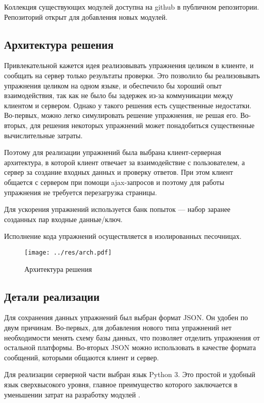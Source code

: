 \documentclass{matmex-diploma-custom}
\begin{document}
Коллекция существующих модулей доступна на github в публичном
репозитории\cite{plugins:repo}. Репозиторий открыт для добавления
новых модулей.

\subsection{Архитектура решения}
Привлекательной кажется идея реализовывать упражнения целиком в
клиенте, и сообщать на сервер только результаты проверки. Это
позволило бы реализовывать упражнения целиком на одном языке, и
обеспечило бы хороший опыт взаимодействия, так как не было бы задержек
из-за коммуникации между клиентом и сервером. Однако у такого решения
есть существенные недостатки. Во-первых, можно легко симулировать
решение упражнения, не решая его. Во-вторых, для решения некоторых
упражнений может понадобиться существенные вычислительные затраты.

Поэтому для реализации упражнений была выбрана клиент-серверная
архитектура, в которой клиент отвечает за взаимодействие с
пользователем, а сервер за создание входных данных и проверку
ответов. При этом клиент общается с сервером при помощи ajax-запросов
и поэтому для работы упражнения не требуется перезагрузка страницы.

Для ускорения упражнений используется банк попыток --- набор
заранее созданных пар входные данные/ключ.

Исполнение кода упражнений осуществляется в изолированных песочницах.

\begin{figure}
  \texttt{[image: ../res/arch.pdf]}
  \caption{Архитектура решения}
\end{figure}

\subsection{Детали реализации}
Для сохранения данных упражнений был выбран формат JSON. Он удобен по
двум причинам. Во-первых, для добавления нового типа упражнений нет
необходимости менять схему базы данных, что позволяет отделить
упражнения от остальной платформы. Во-вторых JSON можно использовать в
качестве формата сообщений, которыми общаются клиент и сервер.

Для реализации серверной части выбран язык Python 3. Это простой и
удобный язык сверхвысокого уровня, главное преимущество которого
заключается в уменьшении затрат на разработку модулей \cite{pyprod}.
\end{document}
